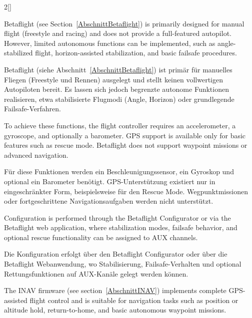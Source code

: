 \begin{paracol}{2}[]
\colende

\renewcommand{\deutschertitel}{Autopilot mit Betaflight}
\renewcommand{\englischertitel}{Autopilot with Betaflight}
\makroabschnitt
\label{AbschnittAutopilotBetaflight}

Betaflight (see Section~\ref{AbschnittBetaflight}) is primarily designed for manual flight (freestyle and racing) and does not provide a full-featured autopilot. However, limited autonomous functions can be implemented, such as angle-stabilized flight, horizon-assisted stabilization, and basic failsafe procedures. 

\colger

Betaflight (siehe Abschnitt~\ref{AbschnittBetaflight}) ist primär für manuelles Fliegen (Freestyle und Rennen) ausgelegt und stellt keinen vollwertigen Autopiloten bereit. Es lassen sich jedoch begrenzte autonome Funktionen realisieren, etwa stabilisierte Flugmodi (Angle, Horizon) oder grundlegende Failsafe-Verfahren. 

\coleng

To achieve these functions, the flight controller requires an accelerometer, a gyroscope, and optionally a barometer. GPS support is available only for basic features such as rescue mode. Betaflight does not support waypoint missions or advanced navigation. 

\colger

Für diese Funktionen werden ein Beschleunigungssensor, ein Gyroskop und optional ein Barometer benötigt. GPS-Unterstützung existiert nur in eingeschränkter Form, beispielsweise für den Rescue Mode. Wegpunktmissionen oder fortgeschrittene Navigationsaufgaben werden nicht unterstützt. 

\coleng

Configuration is performed through the Betaflight Configurator or via the Betaflight web application, where stabilization modes, failsafe behavior, and optional rescue functionality can be assigned to AUX channels.

\colger

Die Konfiguration erfolgt über den Betaflight Configurator oder über die Betaflight Webanwendung, wo Stabilisierung, Failsafe-Verhalten und optional Rettungsfunktionen auf AUX-Kanäle gelegt werden können.

\colende

\renewcommand{\deutschertitel}{Autopilot mit iNAV}
\renewcommand{\englischertitel}{Autopilot with iNAV}
\makroabschnitt
\label{AbschnittAutopilotINAV}

The INAV firmware (see section~\ref{AbschnittINAV}) implements complete GPS-assisted flight control and is suitable for navigation tasks such as position or altitude hold, return-to-home, and basic autonomous waypoint missions.


\end{paracol}
